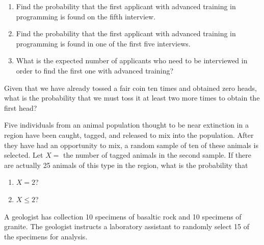 \documentclass[12pt,reqno]{amsart}
\begin{document}
\medskip
\begin{enumerate}
\item Find the probability that the first applicant with advanced training in programming is found on the fifth interview.\vfill
\item Find the probability that the first applicant with advanced training in programming is found in one of the first five interviews.\vfill
\item What is the expected number of applicants who need to be interviewed in order to find the first one with advanced training?\vfill
\end{enumerate}













\bigskip
\prob Given that we have already tossed a fair coin ten times and obtained zero heads, what is the probability that we must toss it at least two more times to obtain the first head?\vfill











\newpage
\prob Five individuals from an animal population thought to be near extinction in a region have been caught, tagged, and released to mix into the population. After they have had an opportunity to mix, a random sample of ten of these animals is selected. Let $X =$ the number of tagged animals in the second sample. If there are actually 25 animals of this type in the region, what is the probability that

\medskip
\begin{enumerate}
\item $X = 2$?\vfill
\item $X\leq2$?\vfill
\end{enumerate}












\bigskip
\prob A geologist has collection 10 specimens of basaltic rock and 10 specimens of granite. The geologist instructs a laboratory assistant to randomly select 15 of the specimens for analysis.
\end{document}

